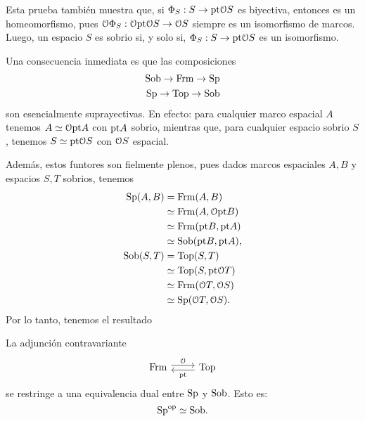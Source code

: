 Esta prueba también muestra que, si $\Phi_S:S\to\pt\cal OS$
es biyectiva, entonces es un homeomorfismo,
pues $\cal O\Phi_S:\cal O\pt\cal OS\to\cal OS$
siempre es un isomorfismo de marcos.
Luego, un espacio $S$ es sobrio si, y solo si,
$\Phi_S:S\to\pt\cal OS$ es un isomorfismo.

Una consecuencia inmediata es que las composiciones
\begin{align*}
    \Sob \to \Frm \to \Sp \\
    \Sp \to \Top \to \Sob
\end{align*}
son esencialmente suprayectivas.
En efecto: para cualquier marco espacial $A$ tenemos
$A\simeq\cal O\pt A$ con $\pt A$ sobrio, mientras que,
para cualquier espacio sobrio $S$, tenemos $S\simeq\pt\cal OS$
con $\cal OS$ espacial.

Además, estos funtores son fielmente plenos, pues dados marcos
espaciales $A,B$ y espacios $S,T$ sobrios, tenemos
\begin{align*}
    \Sp(A,B)
    &= \Frm(A,B) \\
    &\simeq \Frm(A,\cal O\pt B) \\
    &\simeq \Frm(\pt B,\pt A) \\
    &\simeq \Sob(\pt B,\pt A),
    \\
    \Sob(S,T)
    &= \Top(S,T) \\
    &\simeq \Top(S,\pt\cal OT) \\
    &\simeq \Frm(\cal OT,\cal OS) \\
    &\simeq \Sp(\cal OT,\cal OS).
\end{align*}
Por lo tanto, tenemos el resultado
\begin{theorem}
    La adjunción contravariante
    \[
        \begin{tikzcd}
            \Frm \ar[r,"\cal O",shift left]
            & \Top \ar[l,"\pt",shift left]
        \end{tikzcd}
    \]
    se restringe a una equivalencia dual entre $\Sp$ y $\Sob$.
    Esto es:
    \[
        \Sp^\op \simeq \Sob.
    \]
\end{theorem}

